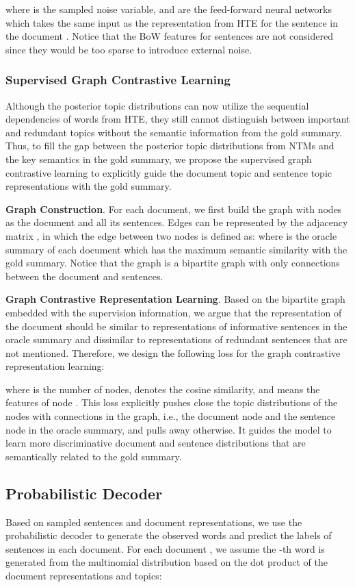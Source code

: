 \documentclass[11pt]{article}
\begin{document}
where  is the sampled noise variable,  and  are the feed-forward neural networks which takes the same input as the representation from HTE for the sentence  in the document .
Notice that the BoW features for sentences are not considered since they would be too sparse to introduce external noise.

\subsubsection{Supervised Graph Contrastive Learning}
Although the posterior topic distributions can now utilize the sequential dependencies of words from HTE, they still cannot distinguish between important and redundant topics without the semantic information from the gold summary.
Thus, to fill the gap between the posterior topic distributions from NTMs and the key semantics in the gold summary, we propose the supervised graph contrastive learning to explicitly guide the document topic and sentence topic representations with the gold summary.

\textbf{Graph Construction}. For each document, we first build the graph  with nodes  as the document and all its sentences.
Edges  can be represented by the adjacency matrix , in which the edge between two nodes  is defined as:
where  is the oracle summary of each document which has the maximum semantic similarity with the gold summary.
Notice that the graph is a bipartite graph with only connections between the document and sentences.

\textbf{Graph Contrastive Representation Learning}. Based on the bipartite graph embedded with the supervision information,
we argue that the representation of the document should be similar to representations of informative sentences in the oracle summary and dissimilar to representations of redundant sentences that are not mentioned.
Therefore, we design the following loss for the graph contrastive representation learning:

where  is the number of nodes,  denotes the cosine similarity, and  means the features of node .
This loss explicitly pushes close the topic distributions of the nodes with connections in the graph, i.e., the document node and the sentence node in the oracle summary, and pulls away otherwise. 
It guides the model to learn more discriminative document and sentence distributions that are semantically related to the gold summary.


\subsection{Probabilistic Decoder}
Based on sampled sentences and document representations, we use the probabilistic decoder to generate the observed words and predict the labels of sentences in each document. 
For each document , we assume the -th word  is generated from the multinomial distribution based on the dot product of the document representations and topics:
\end{document}
